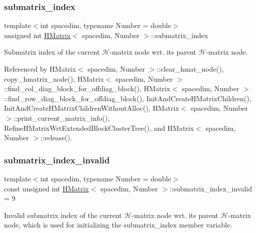 \mbox{\label{classHMatrix_a64c851dd63ba1a466c19f451be369475}} 
\subsubsection{\texorpdfstring{submatrix\+\_\+index}{submatrix\_index}}
{\footnotesize\ttfamily template$<$int spacedim, typename Number = double$>$ \\
unsigned int \hyperlink{classHMatrix}{H\+Matrix}$<$ spacedim, Number $>$\+::submatrix\+\_\+index\hspace{0.3cm}{\ttfamily [private]}}

Submatrix index of the current $\mathcal{H}$-\/matrix node wrt. its parent $\mathcal{H}$-\/matrix node. 

Referenced by H\+Matrix$<$ spacedim, Number $>$\+::clear\+\_\+hmat\+\_\+node(), copy\+\_\+hmatrix\+\_\+node(), H\+Matrix$<$ spacedim, Number $>$\+::find\+\_\+col\+\_\+diag\+\_\+block\+\_\+for\+\_\+offdiag\+\_\+block(), H\+Matrix$<$ spacedim, Number $>$\+::find\+\_\+row\+\_\+diag\+\_\+block\+\_\+for\+\_\+offdiag\+\_\+block(), Init\+And\+Create\+H\+Matrix\+Children(), Init\+And\+Create\+H\+Matrix\+Children\+Without\+Alloc(), H\+Matrix$<$ spacedim, Number $>$\+::print\+\_\+current\+\_\+matrix\+\_\+info(), Refine\+H\+Matrix\+Wrt\+Extended\+Block\+Cluster\+Tree(), and H\+Matrix$<$ spacedim, Number $>$\+::release().

\mbox{\label{classHMatrix_a8b5a9fb65c716187d95bcdb43542884c}} 
\subsubsection{\texorpdfstring{submatrix\+\_\+index\+\_\+invalid}{submatrix\_index\_invalid}}
{\footnotesize\ttfamily template$<$int spacedim, typename Number = double$>$ \\
const unsigned int \hyperlink{classHMatrix}{H\+Matrix}$<$ spacedim, Number $>$\+::submatrix\+\_\+index\+\_\+invalid = 9\hspace{0.3cm}{\ttfamily [static]}}

Invalid submatrix index of the current $\mathcal{H}$-\/matrix node wrt. its parent $\mathcal{H}$-\/matrix node, which is used for initializing the {\ttfamily submatrix\+\_\+index} member variable. 

